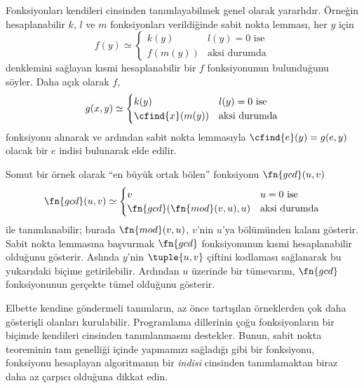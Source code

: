 \documentclass[../../../include/open-logic-section]{subfiles}
\begin{document}

Fonksiyonları kendileri cinsinden tanımlayabilmek genel olarak yararlıdır.
Örneğin hesaplanabilir $k$, $l$ ve $m$ fonksiyonları verildiğinde sabit nokta
lemması, her $y$ için
\[
  f(y)\simeq\begin{cases}
    k(y) & \text{$l(y)=0$ ise}\\
    f(m(y)) & \text{aksi durumda}
  \end{cases}
\]
denklemini sağlayan kısmi hesaplanabilir bir $f$ fonksiyonunun bulunduğunu
söyler. Daha açık olarak $f$,
\[
  g(x,y)\simeq\begin{cases}
    k(y) & \text{$l(y)=0$ ise}\\
    \cfind{x}(m(y)) & \text{aksi durumda}
  \end{cases}
\]
fonksiyonu alınarak ve ardından sabit nokta lemmasıyla
$\cfind{e}(y)=g(e,y)$ olacak bir $e$ indisi bulunarak elde edilir.

Somut bir örnek olarak ``en büyük ortak bölen'' fonksiyonu
$\fn{gcd}(u,v)$
\[
  \fn{gcd}(u,v)\simeq\begin{cases}
    v & \text{$u=0$ ise}\\
    \fn{gcd}(\fn{mod}(v,u),u) & \text{aksi durumda}
  \end{cases}
\]
ile tanımlanabilir; burada $\fn{mod}(v,u)$, $v$'nin $u$'ya bölümünden kalanı
gösterir. Sabit nokta lemmasına başvurmak $\fn{gcd}$ fonksiyonunun kısmi
hesaplanabilir olduğunu gösterir. Aslında $y$'nin $\tuple{u,v}$ çiftini
kodlaması sağlanarak bu yukarıdaki biçime getirilebilir. Ardından $u$
üzerinde bir tümevarım, $\fn{gcd}$ fonksiyonunun gerçekte tümel olduğunu
gösterir.

Elbette kendine göndermeli tanımların, az önce tartışılan örneklerden çok daha
gösterişli olanları kurulabilir. Programlama dillerinin çoğu fonksiyonların
bir biçimde kendileri cinsinden tanımlanmasını destekler. Bunun, sabit nokta
teoreminin tam genelliği içinde yapmamızı sağladığı gibi bir fonksiyonu,
fonksiyonu hesaplayan algoritmanın bir \emph{indisi} cinsinden tanımlamaktan
biraz daha az çarpıcı olduğuna dikkat edin.
\end{document}
